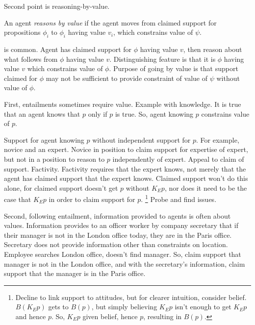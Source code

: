 \begin{note}[\RBV{}]
  Second point is reasoning-by-value.

  \begin{proposition}
    An agent \emph{reasons by value} if the agent moves from claimed support for propositions \(\phi_{i}\) to \(\phi_{i}\) having value \(v_{i}\), which constrains value of \(\psi\).
  \end{proposition}

  \RBV{} is common.
  Agent has claimed support for \(\phi\) having value \(v\), then reason about what follows from \(\phi\) having value \(v\).
  Distinguishing feature is that it is \(\phi\) having value \(v\) which constrains value of \(\phi\).
  Purpose of going by value is that support claimed for \(\phi\) may not be sufficient to provide constraint of value of \(\psi\) without value of \(\phi\).

  First, entailments sometimes require value.
  Example with knowledge.
  It is true that an agent knows that \(p\) only if \(p\) is true.
  So, agent knowing \(p\) constrains value of \(p\).

  Support for agent knowing \(p\) without independent support for \(p\).
  For example, novice and an expert.
  Novice in position to claim support for expertise of expert, but not in a position to reason to \(p\) independently of expert.
  Appeal to claim of support.
  Factivity.
  Factivity requires that the expert knows, not merely that the agent has claimed support that the expert knows.
  Claimed support won't do this alone, for claimed support doesn't get \(p\) without \(K_{E}p\), nor does it need to be the case that \(K_{E}p\) in order to claim support for \(p\).\nolinebreak
  \footnote{
    Decline to link support to attitudes, but for clearer intuition, consider belief.
    \(B(K_{E}p)\) gets to \(B(p)\), but simply believing \(K_{E}p\) isn't enough to get \(K_{E}p\) and hence \(p\).
    So, \(K_{E}p\) given belief, hence \(p\), resulting in \(B(p)\).
  }
  Probe and find issues.

  Second, following entailment, information provided to agents is often about values.
  Information provides to an officer worker by company secretary that if their manager is not in the London office today, they are in the Paris office.
  Secretary does not provide information other than constraints on location.
  Employee searches London office, doesn't find manager.
  So, claim support that manager is not in the London office, and with the secretary's information, claim support that the manager is in the Paris office.


\end{note}
